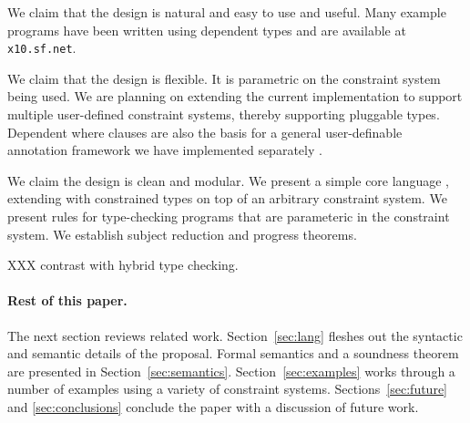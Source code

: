 We claim that the design is natural and easy to use and useful. Many
example programs have been written using dependent types and are
available at {\tt x10.sf.net}.

We claim that the design is flexible. It is parametric on the
constraint system being used. We are planning on extending the current
implementation to support multiple user-defined constraint systems,
thereby supporting pluggable types. Dependent where clauses are also
the basis for a general user-definable annotation framework we have
implemented separately \cite{ns07-x10anno}. 

We claim the design is clean and modular. We present a simple core
language \CFJ, extending \FJ{} \cite{FJ} with constrained types on top
of an arbitrary constraint system. We present rules for type-checking
\CFJ{} programs that are parameteric in the constraint system. 
We establish subject reduction and progress theorems. 

%
XXX contrast with hybrid type checking.

\paragraph{Rest of this paper.}

The next section reviews related work.
Section~\ref{sec:lang} fleshes out the syntactic and semantic details of the
proposal.
Formal semantics
and a soundness theorem
are presented in Section~\ref{sec:semantics}.
Section~\ref{sec:examples} works through a number of
examples using a variety of constraint systems.
Sections~\ref{sec:future}
and \ref{sec:conclusions} conclude the paper with a discussion of
future work.

